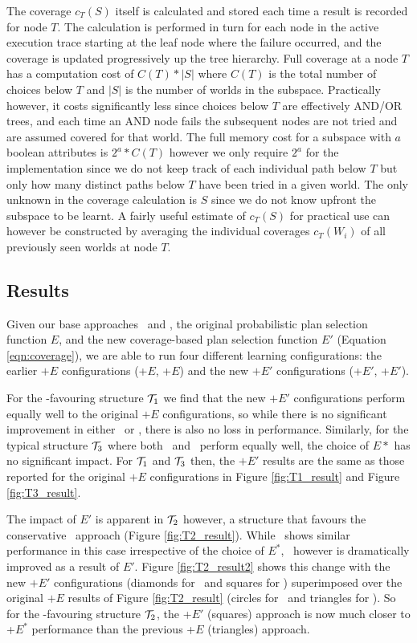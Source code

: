 The coverage $c_T(S)$ itself is calculated and stored each time a result is recorded for node $T$. The calculation is performed in turn for each node in the active execution trace starting at the leaf node where the failure occurred, and the coverage is updated progressively up the tree hierarchy. Full coverage at a node $T$ has a computation cost of $C(T)*|S|$ where $C(T)$ is the total number of choices below $T$ and $|S|$ is the number of worlds in the subspace. Practically however, it costs significantly less since choices below $T$ are effectively AND/OR trees, and each time an AND node fails the subsequent nodes are not tried and are assumed covered for that world. The full memory cost for a subspace with $a$ boolean attributes is $2^a*C(T)$ however we only require $2^a$ for the implementation since we do not keep track of each individual path below $T$ but only how many distinct paths below $T$ have been tried in a given world. The only unknown in the coverage calculation is $S$ since we do not know upfront the subspace to be learnt. A fairly useful estimate of $c_T(S)$ for practical use can however be constructed by averaging the individual coverages $c_T(W_i)$ of all previously seen worlds at node $T$. 

\subsection{Results}

Given our base approaches \CL\ and \BUL, the original probabilistic plan selection function $E$, and the new coverage-based plan selection function $E'$ (Equation \ref{eqn:coverage}), we are able to run four different learning configurations: the earlier $+E$ configurations (\CL+$E$, \BUL+$E$) and the new $+E'$ configurations (\CL+$E'$, \BUL+$E'$).

For the \CL-favouring structure ${\mathcal{T}}_1$ we find that the new $+E'$ configurations perform equally well to the original $+E$ configurations, so while there is no significant improvement in either \CL\ or \BUL, there is also no loss in performance. Similarly, for the typical structure ${\mathcal{T}}_3$ where both \CL\ and \BUL\ perform equally well, the choice of $E*$ has no significant impact. For ${\mathcal{T}}_1$ and ${\mathcal{T}}_3$ then, the $+E'$ results are the same as those reported for the original $+E$ configurations in Figure \ref{fig:T1_result} and Figure \ref{fig:T3_result}.

The impact of $E'$ is apparent in ${\mathcal{T}}_2$ however, a structure that favours the conservative \BUL\ approach (Figure \ref{fig:T2_result}). While \BUL\ shows similar performance in this case irrespective of the choice of $E^*$, \CL\ however is dramatically improved as a result of $E'$. Figure \ref{fig:T2_result2} shows this change with the new $+E'$ configurations (diamonds for \BUL\ and squares for \CL) superimposed over the original $+E$ results of Figure \ref{fig:T2_result} (circles for \BUL\ and triangles for \CL). So for the \BUL-favouring structure ${\mathcal{T}}_2$, the \CL+$E'$ (squares) approach is now much closer to \BUL+$E^*$ performance than the previous \CL+$E$ (triangles) approach.

